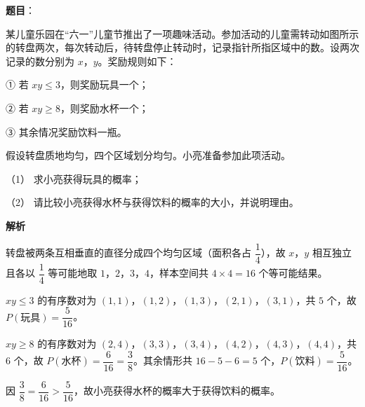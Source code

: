\begin{answer}

\textbf{题目}：

某儿童乐园在“六一”儿童节推出了一项趣味活动。参加活动的儿童需转动如图所示的转盘两次，每次转动后，待转盘停止转动时，记录指针所指区域中的数。设两次记录的数分别为 \(x\)，\(y\)。奖励规则如下：

① 若 \(xy\leqslant 3\)，则奖励玩具一个；

② 若 \(xy\geqslant 8\)，则奖励水杯一个；

③ 其余情况奖励饮料一瓶。

假设转盘质地均匀，四个区域划分均匀。小亮准备参加此项活动。

（1） 求小亮获得玩具的概率；

（2） 请比较小亮获得水杯与获得饮料的概率的大小，并说明理由。
\nopagebreak[4]
\begin{center}\end{center}
\nopagebreak[4]
\textbf{解析}

转盘被两条互相垂直的直径分成四个均匀区域（面积各占 \(\dfrac{1}{4}\)），故 \(x\)，\(y\) 相互独立且各以 \(\dfrac{1}{4}\) 等可能地取 \(1\)，\(2\)，\(3\)，\(4\)，样本空间共 \(4\times 4=16\) 个等可能结果。


\(xy\leqslant 3\) 的有序数对为 \((1,1)\)，\((1,2)\)，\((1,3)\)，\((2,1)\)，\((3,1)\)，共 \(5\) 个，故 \(P(\text{玩具})=\dfrac{5}{16}\)。


\(xy\geqslant 8\) 的有序数对为 \((2,4)\)，\((3,3)\)，\((3,4)\)，\((4,2)\)，\((4,3)\)，\((4,4)\)，共 \(6\) 个，故 \(P(\text{水杯})=\dfrac{6}{16}=\dfrac{3}{8}\)。其余情形共 \(16-5-6=5\) 个，\(P(\text{饮料})=\dfrac{5}{16}\)。

因 \(\dfrac{3}{8}=\dfrac{6}{16}>\dfrac{5}{16}\)，故小亮获得水杯的概率大于获得饮料的概率。



\end{answer}

